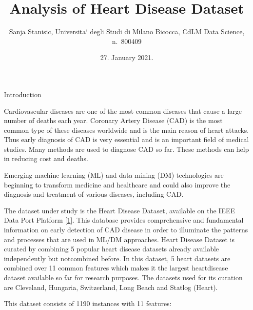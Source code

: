 \documentclass[
  ignorenonframetext,
]{beamer}
\title{Analysis of Heart Disease Dataset}
\author{Sanja Stanisic, Universita` degli Studi di Milano Bicocca, CdLM Data
Science, n.~800409}
\date{27. January 2021.}
\begin{document}
\frame{\titlepage}

\begin{frame}
  \tableofcontents[hideallsubsections]
\end{frame}
\begin{frame}{Introduction}
\protect\hypertarget{introduction}{}

Cardiovascular diseases are one of the most common diseases that cause a
large number of deaths each year. Coronary Artery Disease (CAD) is the
most common type of these diseases worldwide and is the main reason of
heart attacks. Thus early diagnosis of CAD is very essential and is an
important field of medical studies. Many methods are used to diagnose
CAD so far. These methods can help in reducing cost and deaths.

Emerging machine learning (ML) and data mining (DM) technologies are
beginning to transform medicine and healthcare and could also improve
the diagnosis and treatment of various diseases, including CAD.

The dataset under study is the Heart Disease Dataset, available on the
IEEE Data Port Platform {[}\protect\hyperlink{ref-ieeedataport}{1}{]}.
This database provides comprehensive and fundamental information on
early detection of CAD disease in order to illuminate the patterns and
processes that are used in ML/DM approaches. Heart Disease Dataset is
curated by combining 5 popular heart disease datasets already available
independently but notcombined before. In this dataset, 5 heart datasets
are combined over 11 common features which makes it the largest
heartdisease dataset available so far for research purposes. The
datasets used for its curation are Cleveland, Hungaria, Switzerland,
Long Beach and Statlog (Heart).

This dataset consists of 1190 instances with 11 features:


\end{frame}
\end{document}
